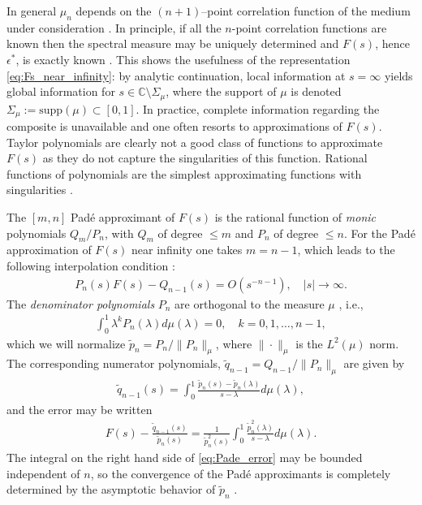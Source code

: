 \documentclass[english,12pt]{ttuthes}
\begin{document}
In general $\mu_n$ depends on the $(n+1)$--point correlation function of
the medium under consideration \cite{Golden:CMP-473,Golden:JMP-5627}. 
In principle, if all the $n$-point correlation functions are known
then the spectral measure may be uniquely determined and $F(s)$, hence
$\epsilon^*$, is exactly known \cite{Shohat:1963}. This shows the usefulness
of the representation \eqref{eq:Fs_near_infinity}: by analytic
continuation, local information at $s=\infty$ yields global information for
$s\in\mathbb{C}\text{\textbackslash}\Sigma_\mu$, where the support of $\mu$ is denoted
$\Sigma_\mu:=\text{supp}(\mu)\subset[0,1]$. In practice, complete 
information regarding the composite is unavailable and one often
resorts to approximations of $F(s)$. Taylor polynomials are clearly
not a good class of functions to approximate $F(s)$ as they do not
capture the singularities of this function. Rational functions of
polynomials are the simplest approximating functions with
singularities \cite{Assche:SAT:2006}.

The $[m,n]$ Pad\'{e} approximant
of $F(s)$ is the rational function of \emph{monic} polynomials
$Q_m/P_n$, with $Q_m$ of degree $\leq m$ and $P_n$ of degree $\leq n$. For
the Pad\'{e} approximation of $F(s)$ near infinity one takes $m=n-1$,
which leads to the following interpolation condition \cite{Assche:SAT:2006}:  
%
\begin{align}
  P_n(s)F(s)-Q_{n-1}(s)=O(s^{-n-1}), \quad |s|\to\infty.
\end{align}
%
The \emph{denominator polynomials} $P_n$ are orthogonal to the measure
$\mu$ \cite{Assche:SAT:2006}, i.e.,
%
\begin{align}
  \int_0^1\lambda^kP_n(\lambda)d\mu(\lambda)=0, \quad k=0,1,\ldots,n-1,
\end{align}
%
which we will normalize $\tilde{p}_n=P_n/\|P_n\|_{\mu}$, where $\|\cdot\|_{\mu}$
is the $L^2(\mu)$ norm. The corresponding numerator polynomials,
$\tilde{q}_{n-1}=Q_{n-1}/\|P_n\|_{\mu}$ are given by \cite{Assche:SAT:2006} 
%
\begin{align}
  \tilde{q}_{n-1}(s)=\int_0^1\frac{\tilde{p}_n(s)-\tilde{p}_n(\lambda)}{s-\lambda}d\mu(\lambda),
\end{align}
%
and the error may be written \cite{Assche:SAT:2006}
%
\begin{align}\label{eq:Pade_error}
  F(s)-\frac{\tilde{q}_{n-1}(s)}{\tilde{p}_n(s)}
      =\frac{1}{\tilde{p}^2_n(s)}\int_0^1\frac{\tilde{p}^2_n(\lambda)}{s-\lambda}d\mu(\lambda).
\end{align}
%
The integral on the right hand side of \eqref{eq:Pade_error} may be
bounded independent of $n$, so the convergence of the Pad\'{e}
approximants is completely determined by the asymptotic behavior of
$\tilde{p}_n$ \cite{Assche:SAT:2006}.  
\end{document}
